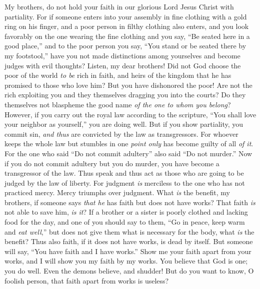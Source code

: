 \begin{biblechapter} %
 My brothers, do not hold your faith in our glorious Lord Jesus Christ with partiality.
\verse For if someone enters into your assembly in fine clothing with a gold ring on his finger, and a poor person in filthy clothing also enters,
\verse and you look favorably on the one wearing the fine clothing and you say, “Be seated here in a good place,” and to the poor person you say, “You stand or be seated there by my footstool,”
\verse have you not made distinctions among yourselves and become judges with evil thoughts?
\verse Listen, my dear brothers! Did not God choose the poor of the world \textit{to be} rich in faith, and heirs of the kingdom that he has promised to those who love him?
\verse But you have dishonored the poor! Are not the rich exploiting you and they themselves dragging you into the courts?
\verse Do they themselves not blaspheme the good name \textit{of the one to whom you belong}?
\verse However, if you carry out the royal law according to the scripture, “You shall love your neighbor as yourself,” you are doing well.
\verse But if you show partiality, you commit sin, \textit{and thus} are convicted by the law as transgressors.
\verse For whoever keeps the whole law but stumbles in one \textit{point only} has become guilty of all \textit{of it}.
\verse For the one who said “Do not commit adultery” also said “Do not murder.” Now if you do not commit adultery but you do murder, you have become a transgressor of the law.
\verse Thus speak and thus act as those who are going to be judged by the law of liberty.
\verse For judgment \textit{is} merciless to the one who has not practiced mercy. Mercy triumphs over judgment.
 What \textit{is} the benefit, my brothers, if someone says \textit{that he} has faith but does not have works? That faith \textit{is} not able to save him, \textit{is it}?
\verse If a brother or a sister is poorly clothed and lacking food for the day,
\verse and one of you should say to them, “Go in peace, keep warm and \textit{eat well},” but does not give them what is necessary for the body, what \textit{is} the benefit?
\verse Thus also faith, if it does not have works, is dead by itself.
\verse But someone will say, “You have faith and I have works.” Show me your faith apart from your works, and I will show you my faith by my works.
\verse You believe that God is one; you do well. Even the demons believe, and shudder!
\verse But do you want to know, O foolish person, that faith apart from works is useless?

\end{biblechapter}
